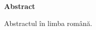 \thispagestyle{plain}

\begin{center}
	\Large \textbf{Abstract}	
\end{center}

Abstractul în limba română.

\vspace*{\fill}
